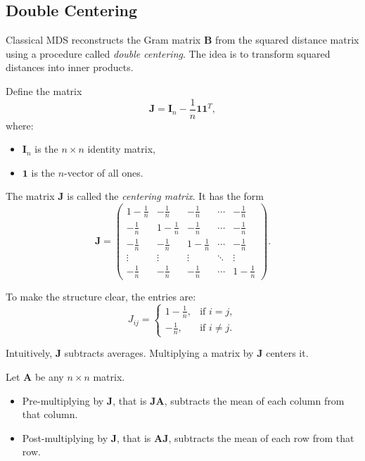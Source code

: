 \subsection{Double Centering}

\medskip

Classical MDS reconstructs the Gram matrix $\mathbf{B}$ from the squared
distance matrix using a procedure called \emph{double centering}.
The idea is to transform squared distances into inner products.

\medskip

Define the matrix
\[
\mathbf{J} = \mathbf{I}_n - \frac{1}{n}\mathbf{1}\mathbf{1}^T,
\]
where:
\begin{itemize}
\item $\mathbf{I}_n$ is the $n \times n$ identity matrix,
\item $\mathbf{1}$ is the $n$-vector of all ones.
\end{itemize}

The matrix $\mathbf{J}$ is called the \emph{centering matrix}.
It has the form
{
\renewcommand{\arraystretch}{1.5}
\[
\mathbf{J}
=
\begin{pmatrix}
1 - \frac{1}{n} & -\frac{1}{n} & -\frac{1}{n} & \cdots & -\frac{1}{n} \\
-\frac{1}{n} & 1 - \frac{1}{n} & -\frac{1}{n} & \cdots & -\frac{1}{n} \\
-\frac{1}{n} & -\frac{1}{n} & 1 - \frac{1}{n} & \cdots & -\frac{1}{n} \\
\vdots & \vdots & \vdots & \ddots & \vdots \\
-\frac{1}{n} & -\frac{1}{n} & -\frac{1}{n} & \cdots & 1 - \frac{1}{n}
\end{pmatrix}.
\]
}

To make the structure clear, the entries are:
\[
J_{ij}
=
\begin{cases}
1 - \frac{1}{n}, & \text{if } i = j, \\
-\frac{1}{n}, & \text{if } i \neq j.
\end{cases}
\]

\medskip

Intuitively, $\mathbf{J}$ subtracts averages.
Multiplying a matrix by $\mathbf{J}$ centers it.

\medskip

Let $\mathbf{A}$ be any $n \times n$ matrix.

\begin{itemize}
\item Pre-multiplying by $\mathbf{J}$, that is $\mathbf{J}\mathbf{A}$,
subtracts the mean of each column from that column.
\item Post-multiplying by $\mathbf{J}$, that is $\mathbf{A}\mathbf{J}$,
subtracts the mean of each row from that row.
\end{itemize}

